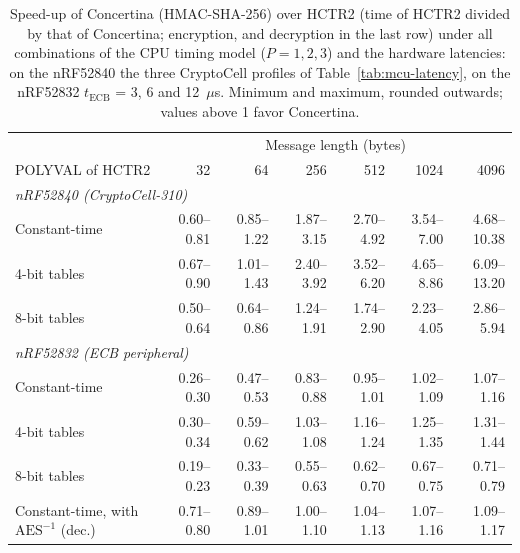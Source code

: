 \begin{table}[!hbt]
\caption{Speed-up of Concertina (HMAC-SHA-256) over HCTR2 (time of HCTR2 divided by that of Concertina; encryption, and decryption in the last row) under all combinations of the CPU timing model ($P = 1, 2, 3$) and the hardware latencies: on the nRF52840 the three CryptoCell profiles of Table~\ref{tab:mcu-latency}, on the nRF52832 $t_\mathrm{ECB}$ = 3, 6 and 12~$\mu$s. Minimum and maximum, rounded outwards; values above 1 favor Concertina.}
\label{tab:mcu-robust}
\centering
\scriptsize
\renewcommand{\arraystretch}{1.25}
\setlength{\tabcolsep}{3pt}
\begin{tabular}{lrrrrrr}
\hline
 & \multicolumn{6}{c}{Message length (bytes)} \\
POLYVAL of HCTR2 & 32 & 64 & 256 & 512 & 1024 & 4096 \\
\hline\hline
\multicolumn{7}{l}{\emph{nRF52840 (CryptoCell-310)}} \\
Constant-time                                & 0.60--0.81 & 0.85--1.22 & 1.87--3.15 & 2.70--4.92 & 3.54--7.00 & 4.68--10.38 \\
4-bit tables                                 & 0.67--0.90 & 1.01--1.43 & 2.40--3.92 & 3.52--6.20 & 4.65--8.86 & 6.09--13.20 \\
8-bit tables                                 & 0.50--0.64 & 0.64--0.86 & 1.24--1.91 & 1.74--2.90 & 2.23--4.05 & 2.86--5.94 \\
\hline
\multicolumn{7}{l}{\emph{nRF52832 (ECB peripheral)}} \\
Constant-time                                & 0.26--0.30 & 0.47--0.53 & 0.83--0.88 & 0.95--1.01 & 1.02--1.09 & 1.07--1.16 \\
4-bit tables                                 & 0.30--0.34 & 0.59--0.62 & 1.03--1.08 & 1.16--1.24 & 1.25--1.35 & 1.31--1.44 \\
8-bit tables                                 & 0.19--0.23 & 0.33--0.39 & 0.55--0.63 & 0.62--0.70 & 0.67--0.75 & 0.71--0.79 \\
Constant-time, with $\mathrm{AES}^{-1}$ (dec.) & 0.71--0.80 & 0.89--1.01 & 1.00--1.10 & 1.04--1.13 & 1.07--1.16 & 1.09--1.17 \\
\hline
\end{tabular}
\end{table}

